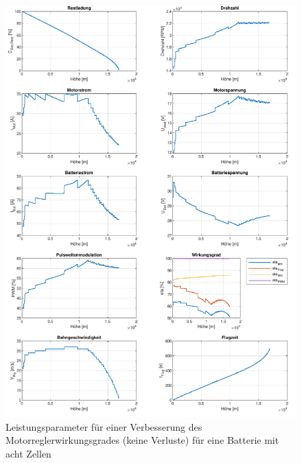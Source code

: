 \begin{appendix}
\begin{figure}[H]
\centering
	\includegraphics[scale=0.7]{Diagramme/Untersuchung_eta_pwm_1_8.pdf}
	\caption{Leistungsparameter für einer Verbesserung des Motorreglerwirkungsgrades (keine Verluste) für eine Batterie mit acht Zellen}
	\label{abb:eta_pwm_8_1}
\end{figure}




\end{appendix}
